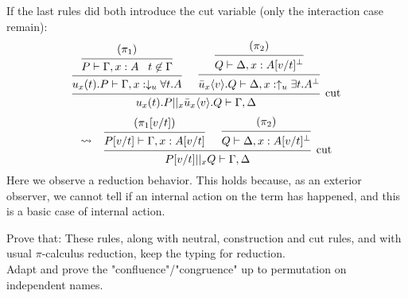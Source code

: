 \documentclass[a4paper,12pt]{article}
\begin{document}
\begin{myproof}
\begin{itemize}
\end{itemize}
If the last rules did both introduce the cut variable (only the interaction case remain):
\[
	\begin{prooftree}
				\hypo{(\pi_1)}
			\infer1{P \vdash \Gamma,x:A\;\;\; t\not\in\Gamma}
		\infer1{u_x(t).P \vdash \Gamma,x:\downarrow_u\forall t.A}
				\hypo{(\pi_2)}
			\infer1{Q \vdash \Delta,x:A[v/t]^\bot}
		\infer1{\bar{u}_x\langle v\rangle.Q \vdash \Delta,x:\uparrow_u\exists t.A^\bot}
	\infer2[cut]{u_x(t).P ||_x \bar{u}_x\langle v\rangle.Q \vdash \Gamma,\Delta}
	\end{prooftree}
\]\[
	\leadsto\;\;\;
	\begin{prooftree}
			\hypo{(\pi_1[v/t])}
		\infer1{P[v/t] \vdash \Gamma,x:A[v/t]}
			\hypo{(\pi_2)}
		\infer1{Q \vdash \Delta,x:A[v/t]^\bot}
	\infer2[cut]{P[v/t] ||_x Q \vdash \Gamma,\Delta}
	\end{prooftree}
\]
Here we observe a reduction behavior. This holds because, as an exterior observer, we cannot tell if an internal action on the term has happened, and this is a basic case of internal action.
\end{myproof}
\newpage
Prove that: These rules, along with neutral, construction and cut rules, and with usual $\pi$-calculus reduction, keep the typing for reduction.\\
Adapt and prove the "confluence"/"congruence" up to permutation on independent names.
\end{document}

